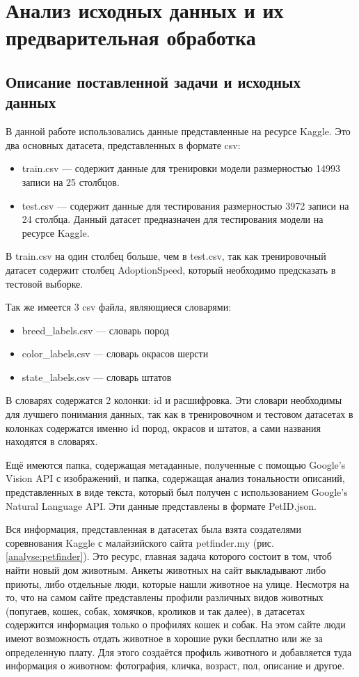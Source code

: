 \documentclass[14pt]{mmcs_article}
\begin{document}
\newpage
\section{Анализ исходных данных и их предварительная обработка}

\subsection{Описание поставленной задачи и исходных данных}

В данной работе использовались данные представленные на ресурсе Kaggle.  Это два основных датасета, представленных в формате csv:

\begin{itemize}
	\item train.csv --- содержит данные для тренировки модели размерностью 14993 записи на 25 столбцов.
	\item test.csv --- содержит данные для тестирования размерностью 3972 записи на 24 столбца. Данный датасет предназначен для тестирования модели на ресурсе Kaggle.
\end{itemize}

В train.csv на один столбец больше, чем в test.csv, так как тренировочный датасет содержит столбец AdoptionSpeed, который необходимо предсказать в тестовой выборке.

Так же имеется 3 csv файла, являющиеся словарями:

\begin{itemize}
	\item breed\_labels.csv --- словарь пород
	\item color\_labels.csv --- словарь окрасов шерсти
	\item state\_labels.csv --- словарь штатов
\end{itemize}

В словарях содержатся 2 колонки: id и расшифровка. Эти словари необходимы для лучшего понимания данных, так как в тренировочном и тестовом датасетах в колонках содержатся именно id пород, окрасов и штатов, а сами названия находятся в словарях.

Ещё имеются папка, содержащая метаданные, полученные с помощью Google’s Vision API с изображений, и папка, содержащая анализ тональности описаний, представленных в виде текста, который был получен с использованием Google’s Natural Language API. Эти данные представлены в формате PetID.json.

Вся информация, представленная в датасетах была взята создателями соревнования Kaggle с малайзийского сайта petfinder.my (рис. \ref{analyse:petfinder}). Это ресурс, главная задача которого состоит в том, чтоб найти новый дом животным. Анкеты животных на сайт выкладывают либо приюты, либо отдельные люди, которые нашли животное на улице. Несмотря на то, что на самом сайте представлены профили различных видов животных (попугаев, кошек, собак, хомячков, кроликов и так далее), в датасетах содержится информация только о профилях кошек и собак. На этом сайте люди имеют возможность отдать животное в хорошие руки бесплатно или же за определенную плату. Для этого создаётся профиль животного и добавляется туда информация о животном: фотография, кличка, возраст, пол, описание и другое.
\end{document}
